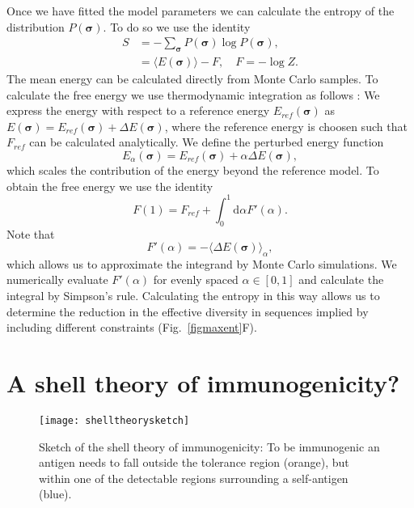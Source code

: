 \documentclass[superscriptaddress,twocolumn,pre]{revtex4}
\newcommand{\B}{\boldsymbol}
\newcommand{\ud}{\mathrm{d}}
\newcommand{\<}{\langle}
\renewcommand{\>}{\rangle}
\begin{document}
Once we have fitted the model parameters we can calculate the entropy of the distribution $P(\B \sigma)$. To do so we use the identity
\begin{align}
    S &= - \sum_{\B \sigma}  P(\B \sigma) \log P(\B \sigma),  \\
      &= \langle E(\B \sigma) \rangle - F, \quad F = - \log Z.
\end{align}
The mean energy can be calculated directly from Monte Carlo samples. To calculate the free energy we use thermodynamic integration as follows \cite{Marchi2019b}: We express the energy with respect to a reference energy $E_{ref}(\B \sigma)$ as $E(\B \sigma) = E_{ref}(\B \sigma) + \Delta E(\B\sigma)$, where the reference energy is choosen such that $F_{ref}$ can be calculated analytically. We define the perturbed energy function
\begin{equation}
    E_\alpha(\B \sigma) = E_{ref}(\B \sigma) + \alpha \Delta E(\B\sigma),
\end{equation}
which scales the contribution of the energy beyond the reference model.
To obtain the free energy we use the identity
\begin{equation}
    F(1) = F_{ref} + \int_0^1 \ud \alpha F'(\alpha).
\end{equation}
Note that
\begin{equation}
    F'(\alpha) = - \langle \Delta E(\B \sigma) \rangle_{\alpha},
\end{equation}
which allows us to approximate the integrand by Monte Carlo simulations. We numerically evaluate $F'(\alpha)$ for evenly spaced $\alpha \in [0, 1]$ and calculate the integral by Simpson's rule. Calculating the entropy in this way allows us to determine the reduction in the effective diversity in sequences implied by including different constraints (Fig.~\ref{figmaxent}F). 






\section{A shell theory of immunogenicity?}

\begin{figure}
    \texttt{[image: shelltheorysketch]}
    \caption{Sketch of the shell theory of immunogenicity: To be immunogenic an antigen needs to fall outside the tolerance region (orange), but within one of the detectable regions surrounding a self-antigen (blue).
    \label{figshelltheorysketch}
    }
\end{figure}
\end{document}
